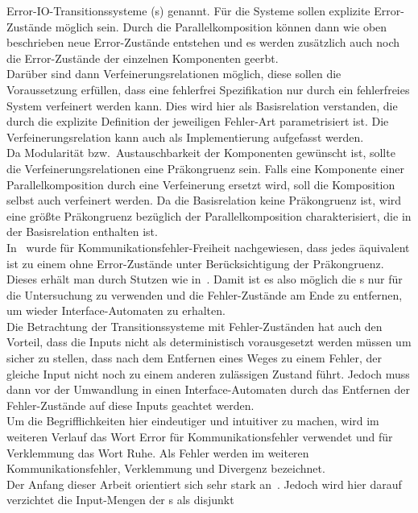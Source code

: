 Error-IO-Transitionssysteme (\EIO{}s) genannt. Für die Systeme sollen explizite
Error-Zustände möglich sein. Durch die Parallelkomposition können dann wie oben
beschrieben neue Error-Zustände entstehen und es werden zusätzlich auch noch die
Error-Zustände der einzelnen Komponenten geerbt.\\
Darüber sind dann Verfeinerungsrelationen möglich, diese sollen die
Voraussetzung erfüllen, dass eine fehlerfrei Spezifikation nur durch ein
fehlerfreies System verfeinert werden kann. Dies wird hier als Basisrelation
verstanden, die durch die explizite Definition der jeweiligen Fehler-Art parametrisiert
ist. Die Verfeinerungsrelation kann auch als Implementierung aufgefasst
werden.\\
Da Modularität bzw.\ Austauschbarkeit der Komponenten gewünscht ist, sollte die
Verfeinerungsrelationen eine Präkongruenz sein. Falls eine Komponente einer
Parallelkomposition durch eine Verfeinerung ersetzt wird, soll die Komposition
selbst auch verfeinert werden. Da die Basisrelation keine Präkongruenz ist,
wird eine größte Präkongruenz bezüglich der Parallelkomposition
charakterisiert, die in der Basisrelation enthalten ist.\\
In~\cite{Vogler2014EIO} wurde für Kommunikationsfehler-Freiheit nachgewiesen, dass jedes \EIO{}
äquivalent ist zu einem ohne Error-Zustände unter Berücksichtigung der
Präkongruenz. Dieses erhält man durch Stutzen wie in~\cite{Alfaro2004}. Damit
ist es also möglich die \EIO{}s nur für die Untersuchung zu verwenden und die
Fehler-Zustände am Ende zu entfernen, um wieder Interface-Automaten zu
erhalten.\\
Die Betrachtung der Transitionssysteme mit Fehler-Zuständen hat auch den
Vorteil, dass die Inputs nicht als deterministisch vorausgesetzt werden müssen
um sicher zu stellen, dass nach dem Entfernen eines Weges zu einem Fehler, der
gleiche Input nicht noch zu einem anderen zulässigen Zustand führt. Jedoch muss
dann vor der Umwandlung in einen Interface-Automaten durch das Entfernen der
Fehler-Zustände auf diese Inputs geachtet werden.\\
Um die Begrifflichkeiten hier eindeutiger und intuitiver zu machen, wird im weiteren Verlauf
das Wort Error für Kommunikationsfehler verwendet und für Verklemmung das Wort
Ruhe. Als Fehler werden im weiteren Kommunikationsfehler, Verklemmung und
Divergenz bezeichnet.\\
Der Anfang dieser Arbeit orientiert sich sehr stark an~\cite{Vogler2014EIO}.
Jedoch wird hier darauf verzichtet die Input-Mengen der \EIO{}s als disjunkt
